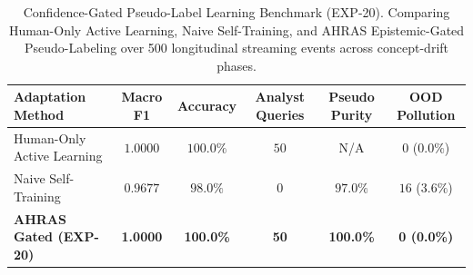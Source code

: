 \begin{table}[t]
\centering
\small
\caption{Confidence-Gated Pseudo-Label Learning Benchmark (EXP-20). Comparing Human-Only Active Learning, Naive Self-Training, and AHRAS Epistemic-Gated Pseudo-Labeling over 500 longitudinal streaming events across concept-drift phases.}
\label{tab:pseudo_label_eval}
\begin{tabular}{lccccc}
\toprule
\textbf{Adaptation Method} & \textbf{Macro F1} & \textbf{Accuracy} & \textbf{Analyst Queries} & \textbf{Pseudo Purity} & \textbf{OOD Pollution} \\
\midrule
Human-Only Active Learning & $1.0000$ & $100.0\%$ & $50$ & N/A & $0$ ($0.0\%$) \\
Naive Self-Training & $0.9677$ & $98.0\%$ & $0$ & $97.0\%$ & $16$ ($3.6\%$) \\
\textbf{AHRAS Gated (EXP-20)} & \textbf{1.0000} & \textbf{100.0\%} & \textbf{50} & \textbf{100.0\%} & \textbf{0 (0.0\%)} \\
\bottomrule
\end{tabular}
\end{table}
